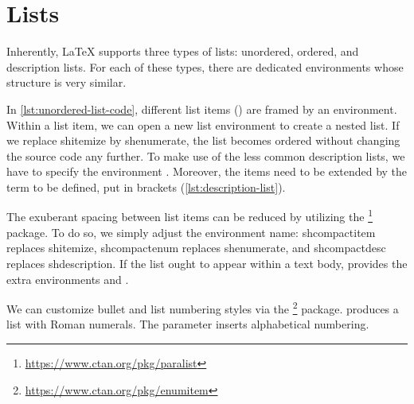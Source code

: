 \chapter{Lists}
\label{sec:lists}

Inherently, \LaTeX{} supports three types of lists: unordered, ordered, and description lists.
For each of these types, there are dedicated environments whose structure is very similar.


In \cref{lst:unordered-list-code}, different list items () are framed by an  environment.
Within a list item, we can open a new list environment to create a nested list.
If we replace sh{itemize} by sh{enumerate}, the list becomes ordered without changing the source code any further.
To make use of the less common description lists, we have to specify the environment .
Moreover, the items need to be extended by the term to be defined, put in brackets (\cref{lst:description-list}).


The exuberant spacing between list items can be reduced by utilizing the \footnote{\url{https://www.ctan.org/pkg/paralist}} package.
To do so, we simply adjust the environment name: sh{compactitem} replaces sh{itemize}, sh{compactenum} replaces sh{enumerate}, and sh{compactdesc} replaces sh{description}.
If the list ought to appear within a text body,  provides the extra environments  and .

We can customize bullet and list numbering styles via the \footnote{\url{https://www.ctan.org/pkg/enumitem}} package.
 produces a list with Roman numerals. 
The parameter  inserts alphabetical numbering.
